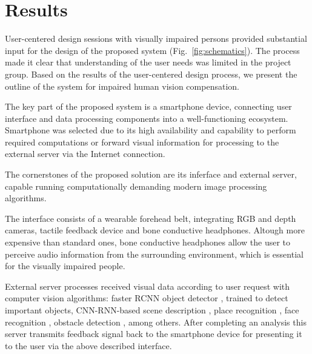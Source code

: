 \documentclass[10pt,conference,compsocconf]{IEEEtran}
\begin{document}
\section{Results}
\label{sec:results}

User-centered design sessions with visually impaired persons provided substantial input for the design of the proposed system (Fig.~\ref{fig:schematics}). The process made it clear that understanding of the user needs was limited in the project group. Based on the results of the user-centered design process, we present the outline of the system for impaired human vision compensation. 

The key part of the proposed system is a smartphone device, connecting user interface and data processing components into a well-functioning ecosystem. Smartphone was selected due to its high availability and capability to perform required computations or forward visual information for processing to the external server via the Internet connection.

The cornerstones of the proposed solution are its inferface and external server, capable running computationally demanding modern image processing algorithms.

The interface consists of a wearable forehead belt, integrating RGB and depth cameras, tactile feedback device and bone conductive headphones. Altough more expensive than standard ones, bone conductive headphones allow the user to perceive audio information from the surrounding environment, which is essential for the visually impaired people.

External server processes received visual data according to user request with computer vision algorithms: faster RCNN object detector \cite{Ren}, trained to detect important objects, CNN-RNN-based scene description \cite{Liu}, place recognition \cite{Ohn-Bar}, face recognition \cite{Amos}, obstacle detection \cite{Laina}, among others. After completing an analysis this server transmits feedback signal back to the smartphone device for presenting it to the user via the above described interface.
\end{document}
